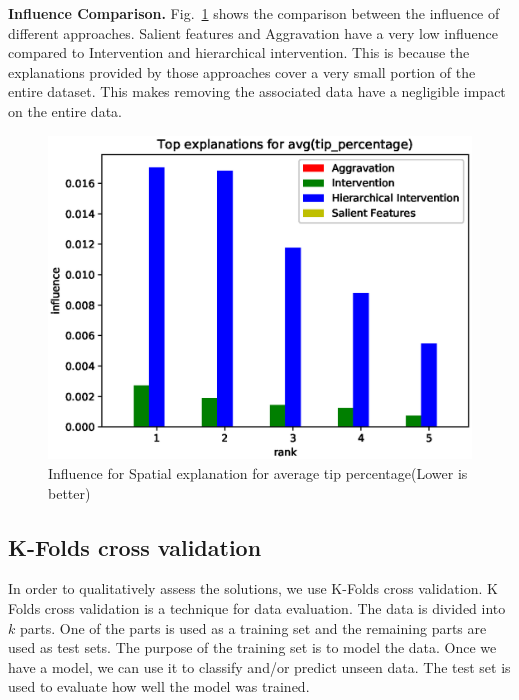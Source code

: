\textbf{Influence Comparison.}
Fig.~\ref{fig:influence_comparison} shows the comparison between the influence of different approaches. Salient features and Aggravation have a very low influence compared to Intervention and hierarchical intervention. This is because the explanations provided by those approaches cover a very small portion of the entire dataset. This makes removing the associated data have a negligible impact on the entire data.
\begin{figure}[h]
\includegraphics[width=\columnwidth]{images/Top_explanations_for_avg_tip_percentage_influence}
\caption{Influence for Spatial explanation for average tip percentage(Lower is better)}
\label{fig:influence_comparison}
\end{figure}

\subsection{K-Folds cross validation}
In order to qualitatively assess the solutions, we use K-Folds cross validation\cite{refaeilzadeh2009cross}. 
K Folds cross validation is a technique for data evaluation\cite{kohavi1995study,refaeilzadeh2009cross}. The data is divided into $k$ parts. One of the parts is used as a training set and the remaining parts are used as test sets. The purpose of the training set is to model the data. Once we have a model, we can use it to classify and/or predict unseen data. The test set is used to evaluate how well the model was trained.

